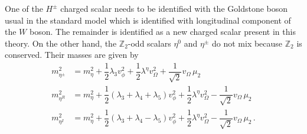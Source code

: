 \documentclass[12pt,letterpaper]{article}
\begin{document}
%
One of the $H^{\pm}$ charged scalar needs to be identified with the Goldstone boson usual in the standard model which is identified with longitudinal component of the $W$ boson. The remainder is identified as a new charged scalar present in this theory.  
%
On the other hand, the $\mathbb{Z}_2$-odd scalars $\eta^0$ and $\eta^{\pm}$ do not mix because $\mathbb{Z}_2$ is conserved. Their masses are given by
%
\begin{align}
\label{eq:masa-etapm}
m_{\eta^\pm}^2 &= m_{\eta}^2 + \dfrac{1}{2}\lambda_3v_{\phi}^2 
+ \dfrac{1}{2}\lambda^{\eta}v_{\Omega}^2 + \dfrac{1}{\sqrt{2}}v_{\Omega}\,\mu_2 \\
\label{eq:masa-etaR}
m_{\eta^R}^2 &= m_{\eta}^2 + \dfrac{1}{2}\left(\lambda_3+\lambda_4+\lambda_5\right) v_{\phi}^2
+ \dfrac{1}{2}\lambda^{\eta}v_{\Omega}^2 - \dfrac{1}{\sqrt{2}}v_{\Omega}\,\mu_2 \\
\label{eq:masa-etapI}
m_{\eta^I}^2 &= m_{\eta}^2 + \dfrac{1}{2}\left(\lambda_3+\lambda_4-\lambda_5\right) v_{\phi}^2
+ \dfrac{1}{2}\lambda^{\eta}v_{\Omega}^2 - \dfrac{1}{\sqrt{2}}v_{\Omega}\,\mu_2\,.
\end{align}
\end{document}
